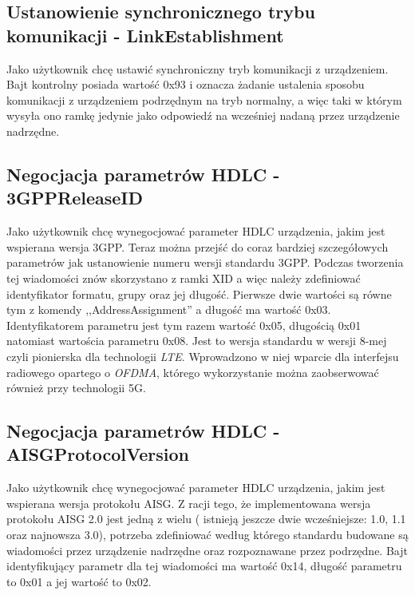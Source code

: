 		\subsection{Ustanowienie synchronicznego trybu komunikacji - LinkEstablishment}
			Jako użytkownik chcę ustawić synchroniczny tryb komunikacji z urządzeniem.
			\newline\newline
			Bajt kontrolny posiada wartość 0x93 i oznacza żadanie ustalenia sposobu komunikacji z urządzeniem podrzędnym na tryb normalny, a więc taki w którym wysyła ono ramkę jedynie jako odpowiedź
			na wcześniej nadaną przez urządzenie nadrzędne.
		 \subsection{Negocjacja parametrów HDLC - 3GPPReleaseID}
			Jako użytkownik chcę wynegocjować parameter HDLC urządzenia, jakim jest wspierana wersja 3GPP. \newline
			\newline\newline
			Teraz można przejść do coraz bardziej szczegółowych parametrów jak ustanowienie numeru wersji standardu 3GPP.
			Podczas tworzenia tej wiadomości znów skorzystano z ramki XID a więc należy zdefiniować identyfikator formatu, grupy oraz jej długość. Pierwsze dwie wartości są równe tym z komendy ,,AddressAssignment'' a długość ma wartość 0x03.
			Identyfikatorem parametru jest tym razem wartość 0x05, długością 0x01 natomiast wartościa parametru 0x08. Jest to wersja standardu w wersji 8-mej czyli pionierska dla technologii \textit{LTE}.
			Wprowadzono w niej wparcie dla interfejsu radiowego opartego o \textit{OFDMA}, którego wykorzystanie można zaobserwować również przy technologii 5G.
		\subsection{Negocjacja parametrów HDLC - AISGProtocolVersion}
			Jako użytkownik chcę wynegocjować parameter HDLC urządzenia, jakim jest wspierana wersja protokołu AISG. \newline
			Z racji tego, że implementowana wersja protokołu AISG 2.0 jest jedną z wielu ( istnieją jeszcze dwie wcześniejsze: 1.0, 1.1 oraz najnowsza 3.0), potrzeba zdefiniować według którego standardu budowane są
			wiadomości przez urządzenie nadrzędne oraz rozpoznawane przez podrzędne.
			Bajt identyfikujący parametr dla tej wiadomości ma wartość 0x14, długość parametru to 0x01 a jej wartość to 0x02.
